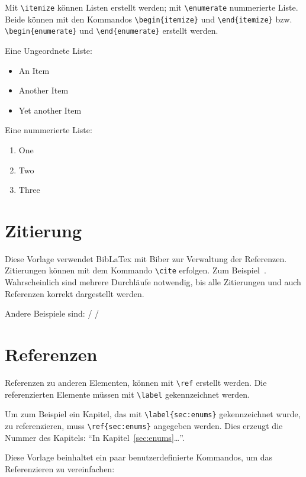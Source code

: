 Mit \verb|\itemize| können Listen erstellt werden; mit \verb|\enumerate| nummerierte Liste. Beide können mit den Kommandos \verb|\begin{itemize}| und \verb|\end{itemize}| bzw. \verb|\begin{enumerate}| und \verb|\end{enumerate}| erstellt werden.
 
Eine Ungeordnete Liste:
\begin{itemize}
  \item An Item
  \item Another Item
  \item Yet another Item
\end{itemize}

Eine nummerierte Liste:
\begin{enumerate}
  \item One
  \item Two
  \item Three
\end{enumerate}

\section{Zitierung}

Diese Vorlage verwendet BibLaTex mit Biber zur Verwaltung der Referenzen. Zitierungen können mit dem Kommando \verb|\cite| erfolgen. Zum Beispiel~\cite{PHD:Fielding}. Wahrscheinlich sind mehrere Durchläufe notwendig, bis alle Zitierungen und auch Referenzen korrekt dargestellt werden.

Andere Beispiele sind: \autocite{Gluchowski.2019} / \textcite{DBLP:conf/edbt/KovacicSSSS18} / \cite[S.~2]{DBLP:journals/ijcis/GolfarelliMR98}

\section{Referenzen}

Referenzen zu anderen Elementen, können mit \verb|\ref| erstellt werden. Die referenzierten Elemente müssen mit \verb|\label| gekennzeichnet werden.

Um zum Beispiel ein Kapitel, das mit \verb|\label{sec:enums}| gekennzeichnet wurde, zu referenzieren, muss \verb|\ref{sec:enums}| angegeben werden. Dies erzeugt die Nummer des Kapitels: ``In Kapitel~\ref{sec:enums}\ldots''.

Diese Vorlage beinhaltet ein paar benutzerdefinierte Kommandos, um das Referenzieren zu vereinfachen:

